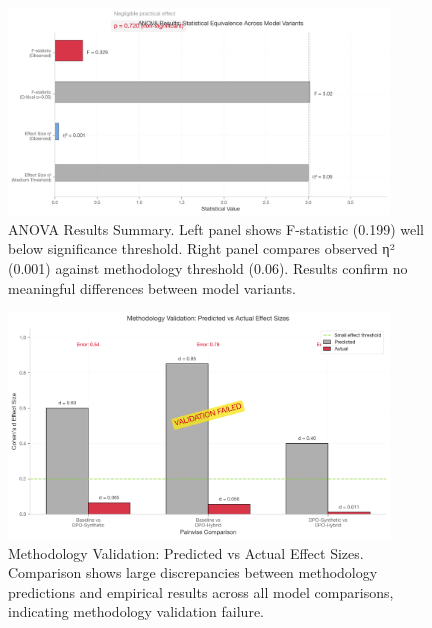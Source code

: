 \begin{figure}[htbp]
    \centering
    \includegraphics[width=0.9\textwidth]{figures/anova_summary.png}
    \caption{ANOVA Results Summary. Left panel shows F-statistic (0.199) well below significance threshold. Right panel compares observed η² (0.001) against methodology threshold (0.06). Results confirm no meaningful differences between model variants.}
    \label{fig:anova-summary}
\end{figure}

\begin{figure}[htbp]
    \centering
    \includegraphics[width=0.9\textwidth]{figures/validation/methodology_validation.png}
    \caption{Methodology Validation: Predicted vs Actual Effect Sizes. Comparison shows large discrepancies between methodology predictions and empirical results across all model comparisons, indicating methodology validation failure.}
    \label{fig:methodology-validation}
\end{figure}

